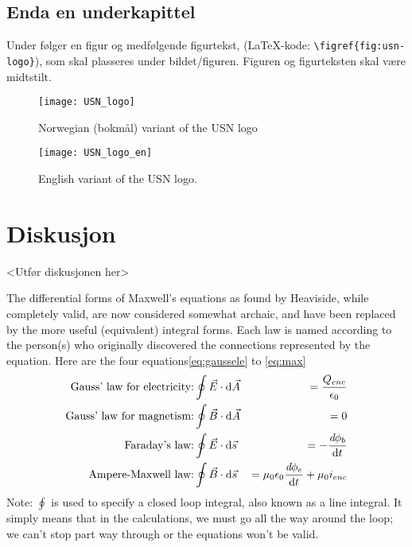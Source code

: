 \documentclass[%
norsk,     %
]{USN-BSc}
\begin{document}
\section{Enda en underkapittel}
\label{sec:endaunderkappittel}

Under følger en figur og medfølgende figurtekst,  (\LaTeX-kode: \verb#\figref{fig:usn-logo}#), som skal plasseres under bildet/figuren. Figuren og figurteksten skal være midtstilt.

\begin{figure}[!ht]
  \centering
  \texttt{[image: USN\_logo]}
  \caption{Norwegian (bokmål) variant of the USN logo}
  \label{fig:usn-logo}
\end{figure}

\lipsum

\begin{figure}[!ht]
  \centering
  \texttt{[image: USN\_logo\_en]}
  \caption{English variant of the USN logo.}
  \label{fig:usn-logo-en}
\end{figure}

\lipsum[9]

\chapter{Diskusjon}
\label{sec:diskusjon}

<Utfør diskusjonen her>

The differential forms of Maxwell's equations as found by Heaviside, while completely valid, are now considered somewhat archaic, and have been replaced by the more useful (equivalent) integral forms. Each law is named according to the person(s) who originally discovered the connections represented by the equation. Here are the four equations\eqref{eq:gaussele} to \eqref{eq:max}
\begin{eqnarray}
  \text{Gauss' law for electricity:}& \displaystyle \oint{\vec{E}\cdot\mathrm{d}\vec{A}}&=\frac{Q_{enc}}{\epsilon_0}\label{eq:gaussele}\\
  \text{Gauss' law for magnetism:}& \displaystyle \oint{\vec{B}\cdot\mathrm{d}\vec{A}}&=0\label{eq:gaussmag}\\
  \text{Faraday's law:}& \displaystyle\oint{\vec{E}\cdot\mathrm{d}\vec{s}}&=-\frac{\emph{d}\phi_b}{\mathrm{d}t}\label{eq:fara}\\
  \text{Ampere-Maxwell law:}& \displaystyle\oint{\vec{B}\cdot\mathrm{d}\vec{s}}&=\mu_0\epsilon_0\frac{\emph{d}\phi_e}{\mathrm{d}t}+\mu_0 i_{enc}\label{eq:max}
\end{eqnarray}
Note: $\oint$ is used to specify a closed loop integral, also known as a line integral. It simply means that in the calculations, we must go all the way around the loop; we can't stop part way through or the equations won't be valid.
\end{document}
